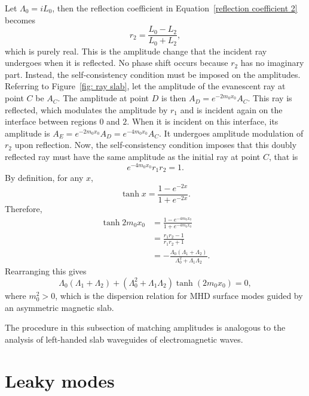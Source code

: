 	Let $\Lambda_0 = iL_0$, then the reflection coefficient in Equation~\eqref{reflection coefficient 2} becomes
	\begin{equation}
	r_2 = \frac{L_0 - L_2}{L_0 + L_2},
	\end{equation}
	which is purely real. This is the amplitude change that the incident ray undergoes when it is reflected. No phase shift occurs because $r_2$ has no imaginary part. Instead, the self-consistency condition must be imposed on the amplitudes. Referring to Figure~\ref{fig: ray slab}, let the amplitude of the evanescent ray at point $C$ be $A_C$. The amplitude at point $D$ is then $A_D = e^{-2m_0x_0}A_C$. This ray is reflected, which modulates the amplitude by $r_1$ and is incident again on the interface between regions $0$ and $2$. When it is incident on this interface, its amplitude is $A_E = e^{-2m_0x_0}A_D = e^{-4m_0x_0}A_C$. It undergoes amplitude modulation of $r_2$ upon reflection. Now, the self-consistency condition imposes that this doubly reflected ray must have the same amplitude as the initial ray at point $C$, that is
	\begin{equation}
	e^{-4m_0x_0}r_1r_2 = 1.
	\end{equation}
	By definition, for any $x$,
	\begin{equation}
	\tanh{x} = \frac{1 - e^{-2x}}{1 + e^{-2x}}.
	\end{equation}
	Therefore,
	\begin{align}
	\tanh{2m_0x_0} &= \frac{1 - e^{-4m_0x_0}}{1 + e^{-4m_0x_0}} \\
	&= \frac{r_1r_2 - 1}{r_1r_2 + 1} \\
	&= -\frac{\Lambda_0(\Lambda_1 + \Lambda_2)}{\Lambda_0^2 + \Lambda_1\Lambda_2}.
	\end{align}
	Rearranging this gives
	\begin{equation}
	\Lambda_0 (\Lambda_1 + \Lambda_2) + (\Lambda_0^2 + \Lambda_1\Lambda_2)\tanh(2m_0x_0) = 0,
	\end{equation}
	where $m_0^2 > 0$, which is the dispersion relation for MHD surface modes guided by an asymmetric magnetic slab.
	
	The procedure in this subsection of matching amplitudes is analogous to the analysis of left-handed slab waveguides of electromagnetic waves.
	
	
	\section{Leaky modes}
	\label{sec: leaky}
	
